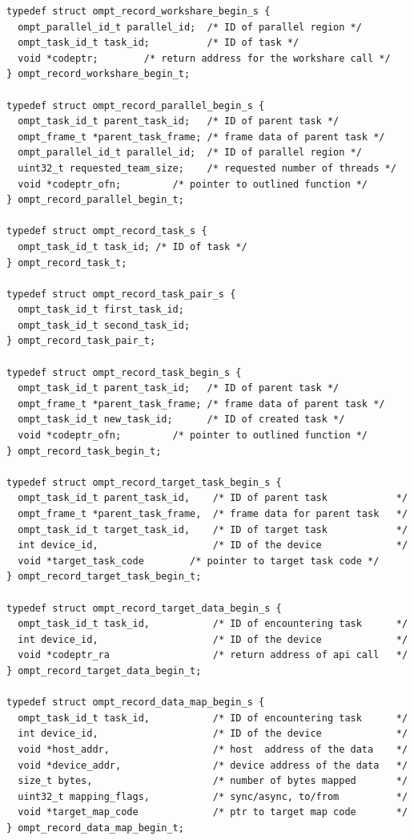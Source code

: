 \documentclass{article}
\begin{document}
{\begin{verbatim}
typedef struct ompt_record_workshare_begin_s {
  ompt_parallel_id_t parallel_id;  /* ID of parallel region */
  ompt_task_id_t task_id;          /* ID of task */
  void *codeptr;        /* return address for the workshare call */
} ompt_record_workshare_begin_t;

typedef struct ompt_record_parallel_begin_s {
  ompt_task_id_t parent_task_id;   /* ID of parent task */
  ompt_frame_t *parent_task_frame; /* frame data of parent task */
  ompt_parallel_id_t parallel_id;  /* ID of parallel region */
  uint32_t requested_team_size;    /* requested number of threads */
  void *codeptr_ofn;         /* pointer to outlined function */
} ompt_record_parallel_begin_t;

typedef struct ompt_record_task_s {
  ompt_task_id_t task_id; /* ID of task */
} ompt_record_task_t;

typedef struct ompt_record_task_pair_s {
  ompt_task_id_t first_task_id; 
  ompt_task_id_t second_task_id;  
} ompt_record_task_pair_t;

typedef struct ompt_record_task_begin_s {
  ompt_task_id_t parent_task_id;   /* ID of parent task */
  ompt_frame_t *parent_task_frame; /* frame data of parent task */
  ompt_task_id_t new_task_id;      /* ID of created task */
  void *codeptr_ofn;         /* pointer to outlined function */
} ompt_record_task_begin_t;

typedef struct ompt_record_target_task_begin_s {
  ompt_task_id_t parent_task_id,    /* ID of parent task            */
  ompt_frame_t *parent_task_frame,  /* frame data for parent task   */
  ompt_task_id_t target_task_id,    /* ID of target task            */
  int device_id,                    /* ID of the device             */
  void *target_task_code        /* pointer to target task code */
} ompt_record_target_task_begin_t;

typedef struct ompt_record_target_data_begin_s {
  ompt_task_id_t task_id,           /* ID of encountering task      */
  int device_id,                    /* ID of the device             */
  void *codeptr_ra                  /* return address of api call   */
} ompt_record_target_data_begin_t;
 
typedef struct ompt_record_data_map_begin_s {
  ompt_task_id_t task_id,           /* ID of encountering task      */
  int device_id,                    /* ID of the device             */
  void *host_addr,                  /* host  address of the data    */
  void *device_addr,                /* device address of the data   */ 
  size_t bytes,                     /* number of bytes mapped       */
  uint32_t mapping_flags,           /* sync/async, to/from          */
  void *target_map_code             /* ptr to target map code       */
} ompt_record_data_map_begin_t;


\end{verbatim}}
\end{document}
